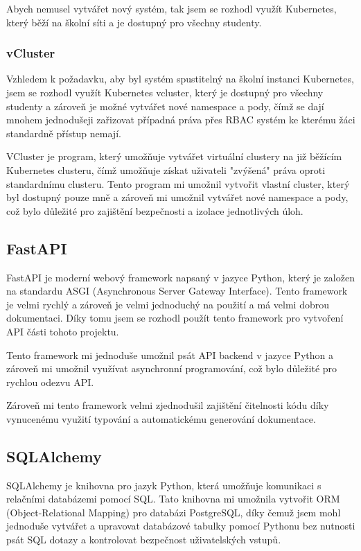 \documentclass[12pt, a4paper,
oneside,      %
openright
]{report}
\begin{document}
Abych nemusel vytvářet nový systém, tak jsem se rozhodl využít Kubernetes, který běží na školní síti a je dostupný pro všechny studenty.

\subsubsection{vCluster}
Vzhledem k požadavku, aby byl systém spustitelný na školní instanci Kubernetes, jsem se rozhodl využít Kubernetes vcluster, který je dostupný pro všechny studenty a zároveň je možné vytvářet nové namespace a pody, čímž se dají mnohem jednodušeji zařizovat případná práva přes RBAC systém ke kterému žáci standardně přístup nemají.

VCluster je program, který umožňuje vytvářet virtuální clustery na již běžícím Kubernetes clusteru, čímž umožňuje získat uživateli "zvýšená" práva oproti standardnímu clusteru. Tento program mi umožnil vytvořit vlastní cluster, který byl dostupný pouze mně a zároveň mi umožnil vytvářet nové namespace a pody, což bylo důležité pro zajištění bezpečnosti a izolace jednotlivých úloh.

\subsection{FastAPI}
FastAPI je moderní webový framework napsaný v jazyce Python, který je založen na standardu ASGI (Asynchronous Server Gateway Interface). Tento framework je velmi rychlý a zároveň je velmi jednoduchý na použití a má velmi dobrou dokumentaci. Díky tomu jsem se rozhodl použít tento framework pro vytvoření API části tohoto projektu.

Tento framework mi jednoduše umožnil psát API backend v jazyce Python a zároveň mi umožnil využívat asynchronní programování, což bylo důležité pro rychlou odezvu API.

Zároveň mi tento framework velmi zjednodušil zajištění čitelnosti kódu díky vynucenému využití typování a automatickému generování dokumentace.

\subsection{SQLAlchemy}
SQLAlchemy je knihovna pro jazyk Python, která umožňuje komunikaci s relačními databázemi pomocí SQL. Tato knihovna mi umožnila vytvořit ORM (Object-Relational Mapping) pro databázi PostgreSQL, díky čemuž jsem mohl jednoduše vytvářet a upravovat databázové tabulky pomocí Pythonu bez nutnosti psát SQL dotazy a kontrolovat bezpečnost uživatelských vstupů.
\end{document}
